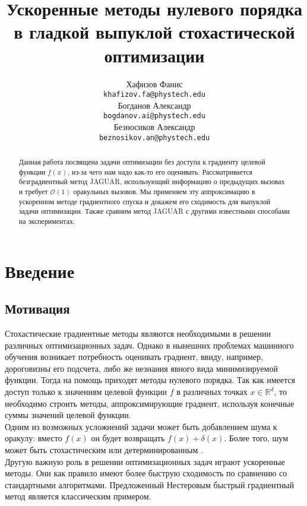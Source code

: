 \documentclass{article}
\title{Ускоренные методы нулевого порядка в гладкой выпуклой стохастической оптимизации}
\author{
	Хафизов Фанис \\
	\texttt{khafizov.fa@phystech.edu} \\
	\And
	Богданов Александр \\
	\texttt{bogdanov.ai@phystech.edu} \\
	\And
	Безносиков Александр \\
	\texttt{beznosikov.an@phystech.edu}
}
\date{}
\newcommand{\R}{\mathbb{R}}
\begin{document}
\maketitle

\begin{abstract}
Данная работа посвящена задачи оптимизации без доступа к градиенту целевой функции $f(x)$, из-за чего нам надо как-то его оценивать. Рассматривается безградиентный метод JAGUAR, использующий информацию о предыдущих вызовах и требует $\mathcal{O}(1)$ оракульных вызовов. Мы применяем эту аппроксимацию в ускоренном методе градиентного спуска и докажем его сходимость для выпуклой задачи оптимизации. Также сравним метод JAGUAR с другими известными способами на экспериментах.

\end{abstract}


\section{Введение}
\subsection{Мотивация}
Стохастические градиентные методы являются необходимыми в решении различных оптимизационных задач. Однако в нынешних проблемах машинного обучения возникает потребность оценивать градиент, ввиду, например, дороговизны его подсчета, либо же незнания явного вида минимизируемой функции. Тогда на помощь приходят методы нулевого порядка. Так как имеется доступ только к значениям целевой функции $f$ в различных точках $x \in \R^d$, то необходимо строить методы, аппроксимирующие градиент, используя конечные суммы значений целевой функции.\\
Одним из возможных усложнений задачи может быть добавлением шума к оракулу: вместо $f(x)$ он будет возвращать $f(x) + \delta (x)$. Более того, шум может быть стохастическим \cite{lucchi2022theoretical} или детерминированным \cite{lobanov2023zeroorder}.\\
Другую важную роль в решении оптимизационных задач играют ускоренные методы. Они как правило имеют более быструю сходимость по сравнению со стандартными алгоритмами. Предложенный Нестеровым \cite{Nesterov1983AMF} быстрый градиентный метод является классическим примером.
\end{document}
